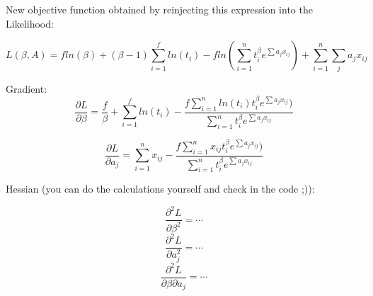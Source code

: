 \documentclass[a4paper,11pt]{article}
\begin{document}
New objective function obtained by reinjecting this expression into the Likelihood:

$$ L(\beta,A) = fln(\beta) +(\beta-1)\sum_{i=1}^{f} ln(t_i) - fln(\sum_{i=1}^n t_i^{\beta} e^{\sum a_j x_{ij}}) + \sum_{i=1}^n \sum_j a_j x_{ij} $$

Gradient:
$$\frac{\partial L}{\partial \beta} = \frac f\beta +\sum_{i=1}^{f} ln(t_i) - \frac{f\sum_{i=1}^n ln(t_i)t_i^{\beta} e^{\sum a_j x_{ij}})}{\sum_{i=1}^n t_i^{\beta} e^{\sum a_j x_{ij}}} $$

$$\frac{\partial L}{\partial a_j} = \sum_{i=1}^n x_{ij} - \frac{f\sum_{i=1}^n x_{ij} t_i^{\beta} e^{\sum a_j x_{ij}})}{\sum_{i=1}^n t_i^{\beta} e^{\sum a_j x_{ij}}} $$

Hessian (you can do the calculations yourself and check in the code ;)):

$$\frac{\partial^2 L}{\partial \beta^2} = \cdots$$
$$\frac{\partial^2 L}{\partial a_j^2} = \cdots$$
$$\frac{\partial^2 L}{\partial \beta \partial a_j} = \cdots$$
\end{document}
